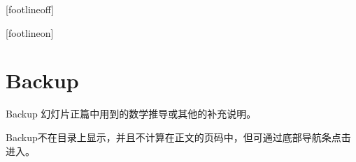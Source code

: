 \documentclass[10pt]{beamer}	%
\begin{document}
[footlineoff]%
\begin{frame}[noframenumbering]
	\thanks
\end{frame}
[footlineon]%

\section*{Backup}
\begin{frame}[noframenumbering]{Backup}
幻灯片正篇中用到的数学推导或其他的补充说明。

Backup不在目录上显示，并且不计算在正文的页码中，但可通过底部导航条点击进入。
\end{frame}
\end{document}
